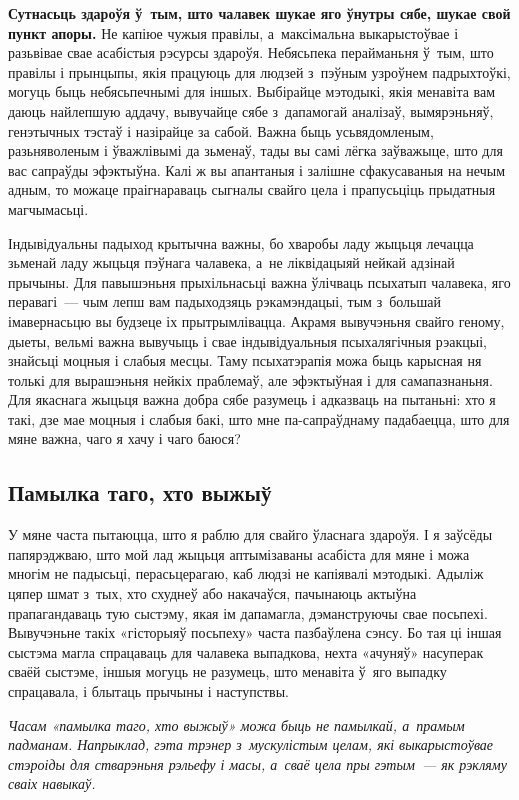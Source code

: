 \textbf{Сутнасьць здароўя ў~тым, што чалавек шукае яго ўнутры сябе, шукае свой пункт апоры.} Не капіюе чужыя правілы, а~максімальна выкарыстоўвае і разьвівае свае асабістыя рэсурсы здароўя. Небясьпека перайманьня ў~тым, што правілы і прынцыпы, якія працуюць для людзей з~пэўным узроўнем падрыхтоўкі, могуць быць небясьпечнымі для іншых. Выбірайце мэтодыкі, якія менавіта вам даюць найлепшую аддачу, вывучайце сябе з~дапамогай аналізаў, вымярэньняў, генэтычных тэстаў і назірайце за сабой. Важна быць усьвядомленым, разьняволеным і ўважлівымі да зьменаў, тады вы самі лёгка заўважыце, што для вас сапраўды эфэктыўна. Калі ж вы апантаныя і залішне сфакусаваныя на нечым адным, то можаце праігнараваць сыгналы свайго цела і прапусьціць прыдатныя магчымасьці.

Індывідуальны падыход крытычна важны, бо хваробы ладу жыцьця лечацца зьменай ладу жыцьця пэўнага чалавека, а~не ліквідацыяй нейкай адзінай прычыны. Для павышэньня прыхільнасьці важна ўлічваць псыхатып чалавека, яго перавагі~--- чым лепш вам падыходзяць рэкамэндацыі, тым з~большай імавернасьцю вы будзеце іх прытрымлівацца. Акрамя вывучэньня свайго геному, дыеты, вельмі важна вывучыць і свае індывідуальныя псыхалягічныя рэакцыі, знайсьці моцныя і слабыя месцы. Таму псыхатэрапія можа быць карысная ня толькі для вырашэньня нейкіх праблемаў, але эфэктыўная і для самапазнаньня. Для якаснага жыцьця важна добра сябе разумець і адказваць на пытаньні: хто я такі, дзе мае моцныя і слабыя бакі, што мне па-сапраўднаму падабаецца, што для мяне важна, чаго я хачу і чаго баюся?

\subsection*{Памылка таго, хто выжыў}

У мяне часта пытаюцца, што я раблю для свайго ўласнага здароўя. І я заўсёды папярэджваю, што мой лад жыцьця аптымізаваны асабіста для мяне і можа многім не падысьці, перасьцерагаю, каб людзі не капіявалі мэтодыкі. Адыліж цяпер шмат з~тых, хто схуднеў або накачаўся, пачынаюць актыўна прапагандаваць тую сыстэму, якая ім дапамагла, дэманструючы свае посьпехі. Вывучэньне такіх «гісторыяў посьпеху» часта пазбаўлена сэнсу. Бо тая ці іншая сыстэма магла спрацаваць для чалавека выпадкова, нехта «ачуняў» насуперак сваёй сыстэме, іншыя могуць не разумець, што менавіта ў~яго выпадку спрацавала, і блытаць прычыны і наступствы.

\emph{Часам «памылка таго, хто выжыў» можа быць не памылкай, а~прамым падманам. Напрыклад, гэта трэнер з~мускулістым целам, які выкарыстоўвае стэроіды для стварэньня рэльефу і масы, а~сваё цела пры гэтым~--- як рэкляму сваіх навыкаў.}

